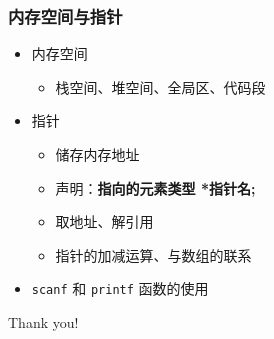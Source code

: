 \begin{frame}[fragile]
    \frametitle{内存空间与指针}

    \begin{itemize}
        \item<1-> 内存空间
            \begin{itemize}
                \item 栈空间、堆空间、全局区、代码段
            \end{itemize}
       \item<2-> 指针
            \begin{itemize}
                \item 储存内存地址
                \item 声明：\textbf{指向的元素类型 *指针名;}
                \item 取地址、解引用
                \item 指针的加减运算、与数组的联系
            \end{itemize}
       \item<3-> \lstinline|scanf| 和 \lstinline|printf| 函数的使用
    \end{itemize}
\end{frame}

\begin{frame}
    \begin{center}
        {\Huge Thank you!}
    \end{center}
\end{frame}


